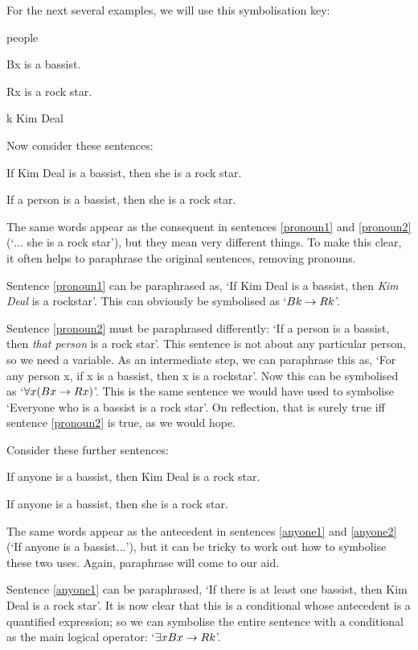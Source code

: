 For the next several examples, we will use this symbolisation key:
	\begin{ekey}
		\item[\text{domain}] people
		\item[Bx]  is a bassist.
		\item[Rx]  is a rock star.
		\item[k] Kim Deal
	\end{ekey}
Now consider these sentences:
	\begin{earg}
		\item[\ex{pronoun1}] If Kim Deal is a bassist, then she is a rock star.
		\item[\ex{pronoun2}] If a person is a bassist, then she is a rock star.
	\end{earg}
The same words appear as the consequent in sentences \ref{pronoun1} and \ref{pronoun2} (`$\ldots$ she is a rock star'), but they mean very different things. To make this clear, it often helps to paraphrase the original sentences, removing pronouns.

Sentence \ref{pronoun1} can be paraphrased as, `If Kim Deal is a bassist, then \emph{Kim Deal} is a rockstar'. This can obviously be symbolised as `$Bk \rightarrow Rk$'.

Sentence \ref{pronoun2} must be paraphrased differently: `If a person is a bassist, then \emph{that person} is a rock star'. This sentence is not about any particular person, so we need a variable. As an intermediate step, we can paraphrase this as, `For any person x, if x is a bassist, then x is a rockstar'. Now this can be symbolised as `$\forall x (Bx \rightarrow Rx)$'. This is the same sentence we would have used to symbolise `Everyone who is a bassist is a rock star'. On reflection, that is surely true iff sentence \ref{pronoun2} is true, as we would hope.

Consider these further sentences:
	\begin{earg}
		\item[\ex{anyone1}] If anyone is a bassist, then Kim Deal is a rock star.
		\item[\ex{anyone2}] If anyone is a bassist, then she is a rock star.
	\end{earg}
The same words appear as the antecedent in sentences \ref{anyone1} and \ref{anyone2}  (`If anyone is a bassist$\ldots$'), but it can be tricky to work out how to symbolise these two uses. Again, paraphrase will come to our aid. 

Sentence \ref{anyone1} can be paraphrased, `If there is at least one bassist, then Kim Deal is a rock star'. It is now clear that this is a conditional whose antecedent is a quantified expression; so we can symbolise the entire sentence with a conditional as the main logical operator: `$\exists x Bx \rightarrow Rk$'.

